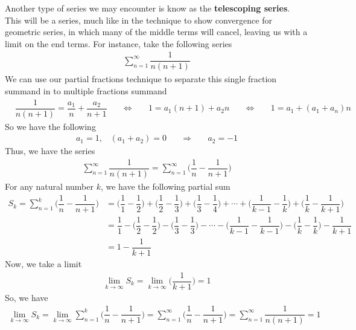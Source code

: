 \begin{example}
Another type of series we may encounter is know as the \textbf{telescoping series}. This will be a series, much like in the technique to show convergence for geometric series, in which many of the middle terms will cancel, leaving us with a limit on the end terms. For instance, take the following series
\begin{align*}
    \sum_{n = 1}^{\infty} \dfrac{1}{n(n+1)}
\end{align*}
We can use our partial fractions technique to separate this single fraction summand in to multiple fractions summand
\begin{align*}
    &\dfrac{1}{n(n+1)} = \dfrac{a_{1}}{n} + \dfrac{a_{2}}{n+1} \hspace{20pt} \Longleftrightarrow \hspace{20pt} 1 = a_{1}(n+1) + a_{2}n \hspace{20pt} \Longleftrightarrow \hspace{20pt} 1 = a_{1} + (a_{1} + a_{n})n
\end{align*}
So we have the following
\begin{align*}
    a_{1} = 1, \hspace{10pt} (a_{1} + a_{2}) = 0 \hspace{20pt} \Longrightarrow \hspace{20pt} a_{2} = -1
\end{align*}
Thus, we have the series
\begin{align*}
    \sum_{n = 1}^{\infty} \dfrac{1}{n(n+1)} = \sum_{n = 1}^{\infty} \Big(\dfrac{1}{n} - \dfrac{1}{n+1}\Big)
\end{align*}
For any natural number $k$, we have the following partial sum
\begin{align*}
    S_{k} = \sum_{n = 1}^{k} \Big(\dfrac{1}{n} - \dfrac{1}{n+1}\Big) &= \Big(\dfrac{1}{1} - \dfrac{1}{2}\Big) + \Big(\dfrac{1}{2} - \dfrac{1}{3}\Big) + \Big(\dfrac{1}{3} - \dfrac{1}{4}\Big) + \cdots + \Big(\dfrac{1}{k-1} - \dfrac{1}{k}\Big) + \Big(\dfrac{1}{k} - \dfrac{1}{k+1}\Big)\\[2ex]
    &= \dfrac{1}{1} - \Big(\dfrac{1}{2} - \dfrac{1}{2}\Big) - \Big(\dfrac{1}{3} - \dfrac{1}{3}\Big) - \cdots - \Big(\dfrac{1}{k-1} - \dfrac{1}{k-1}\Big) - \Big(\dfrac{1}{k} - \dfrac{1}{k}\Big) - \dfrac{1}{k+1}\\[2ex]
    &= 1 - \dfrac{1}{k+1}
\end{align*}
Now, we take a limit
\begin{align*}
    \lim_{k \longrightarrow \infty} S_{k} = \lim_{k \longrightarrow \infty} \Big(\dfrac{1}{k+1}\Big) = 1
\end{align*}
So, we have
\begin{align*}
    \lim_{k \longrightarrow \infty} S_{k} = \lim_{k \longrightarrow \infty} \sum_{n=1}^{k} \Big(\dfrac{1}{n} - \dfrac{1}{n+1}\Big) = \sum_{n=1}^{\infty} \Big(\dfrac{1}{n} - \dfrac{1}{n+1}\Big) = \sum_{n = 1}^{\infty} \dfrac{1}{n(n+1)} = 1
\end{align*}
\end{example}



